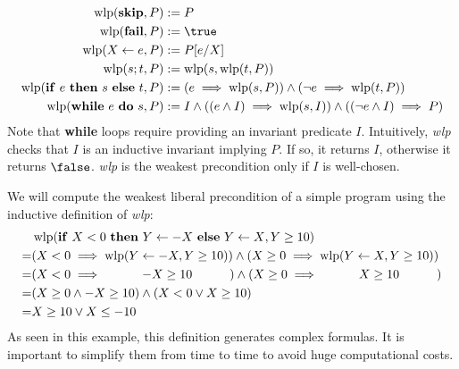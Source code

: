 \documentclass[toc]{../cs-classes/cs-classes}
\DeclareMathOperator{\wlp}{wlp}
\begin{document}
\begin{definition}
    \begin{equation*}
        \begin{aligned}
            \wlp(\textnormal{\bf skip}, P) &:= P\\
            \wlp(\textnormal{\bf fail}, P) &:= \true\\
            \wlp(X\leftarrow e, P) &:= P[e/X]\\
            \wlp(s;t, P) &:= \wlp(s, \wlp(t, P))\\
            \wlp(\textnormal{\textbf{if} $e$ \textbf{then} $s$ \textbf{else} $t$}, P) &:= (e\implies\wlp(s, P)) \land (\lnot e\implies\wlp(t, P))\\
            \wlp(\textnormal{\textbf{while} $e$ \textbf{do} $s$}, P) &:= I\land((e\land I)\implies\wlp(s, I)) \land ((\lnot e\land I)\implies P)
        \end{aligned}
    \end{equation*}
    Note that \textbf{while} loops require providing an invariant predicate $I$. Intuitively, \emph{wlp} checks that $I$ is an inductive invariant implying $P$. If so, it returns $I$, otherwise it returns $\false$. \emph{wlp} is the weakest precondition only if $I$ is well-chosen.
\end{definition}

\begin{example}
    We will compute the weakest liberal precondition of a simple program using the inductive definition of \emph{wlp}:
    \begin{equation*}
        \begin{aligned}
            &\wlp(\textnormal{\textbf{if} $X<0$ \textbf{then} $Y\leftarrow-X$ \textbf{else} $Y\leftarrow X$}, Y\geq10)\\
            = &(X<0\implies\wlp(Y\leftarrow-X, Y\geq10)) \land (X\geq0 \implies \wlp(Y\leftarrow X, Y\geq10))\\
            = &(X<0\implies \quad\qquad -X\geq10 \quad\qquad) \land (X\geq0\implies \quad\qquad X\geq10\qquad\quad)\\
            = &(X\geq0\land-X\geq10) \land (X<0\lor X\geq10)\\
            = &X\geq10\lor X\leq-10
        \end{aligned}
    \end{equation*}
    As seen in this example, this definition generates complex formulas. It is important to simplify them from time to time to avoid huge computational costs.
\end{example}
\end{document}
